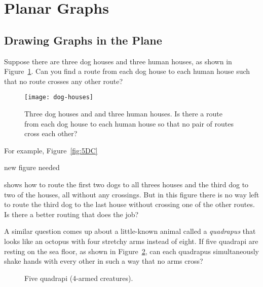 \section{Planar Graphs}\label{planar_graphs_sec}

\subsection{Drawing Graphs in the Plane}

Suppose there are three dog houses and three human houses, as shown in
Figure~\ref{fig:5DP}.  Can you find a route from each dog house to
each human house such that no route crosses any other route?

\begin{figure}\redrawn


\texttt{[image: dog-houses]}

\caption{Three dog houses and and three human houses.  Is there a
  route from each dog house to each human house so that no pair of
  routes cross each other?}
\label{fig:5DP}
\end{figure}

For example, Figure~\ref{fig:5DC} \begin{editingnotes}
new figure needed
\end{editingnotes} shows how to route the first two dogs to all threes
houses and the third dog to two of the houses, all without any crossings.
But in this figure there is no way left to route the third dog to the last
house without crossing one of the other routes.  Is there a better routing
that does the job?

A similar question comes up about a little-known animal called a
\emph{quadrapus} that looks like an octopus with four stretchy arms
instead of eight.  If five quadrapi are resting on the sea floor, as shown
in Figure~\ref{fig:5DA}, can each quadrapus simultaneously shake hands
with every other in such a way that no arms cross?

\begin{figure}




\caption{Five quadrapi (4-armed creatures).}

\label{fig:5DA}

\end{figure}

